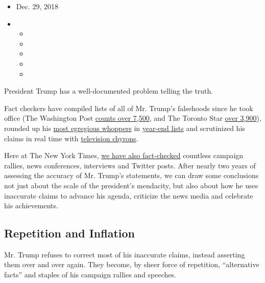 \begin{itemize}
\item
  Dec. 29, 2018
\item
  \begin{itemize}
  \item
  \item
  \item
  \item
  \item
  \end{itemize}
\end{itemize}

President Trump has a well-documented problem telling the truth.

Fact checkers have compiled lists of all of Mr. Trump's falsehoods since
he took office (The Washington Post
\href{https://www.washingtonpost.com/graphics/politics/trump-claims-database/?utm_term=.f0fb3ee77790}{counts
over 7,500}, and The Toronto Star
\href{http://projects.thestar.com/donald-trump-fact-check/}{over
3,900}), rounded up his
\href{https://www.politifact.com/truth-o-meter/article/2018/dec/11/trump-file-10-top-falsehoods-2018/}{most
egregious whoppers} in
\href{https://www.factcheck.org/2018/12/the-whoppers-of-2018/}{year-end
lists} and scrutinized his claims in real time with
\href{https://www.washingtonpost.com/graphics/2018/lifestyle/style/how-cable-news-chyrons-have-adapted-to-the-trump-era/?utm_term=.5d2df35f9e33}{television
chyrons}.

Here at The New York Times,
\href{https://www.nytimes.com/spotlight/fact-checks}{we have also
fact-checked} countless campaign rallies, news conferences, interviews
and Twitter posts. After nearly two years of assessing the accuracy of
Mr. Trump's statements, we can draw some conclusions not just about the
scale of the president's mendacity, but also about how he uses
inaccurate claims to advance his agenda, criticize the news media and
celebrate his achievements.

\hypertarget{repetition-and-inflation}{%
\subsection{Repetition and Inflation}\label{repetition-and-inflation}}

Mr. Trump refuses to correct most of his inaccurate claims, instead
asserting them over and over again. They become, by sheer force of
repetition, ``alternative facts'' and staples of his campaign rallies
and speeches.

